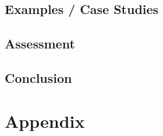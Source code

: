 \documentclass[10pt,a4paper,titlepage,draft]{report} %
\begin{document}
\section{Examples / Case Studies}


\section{Assessment}

\section{Conclusion}




\chapter*{Appendix}
\end{document}

